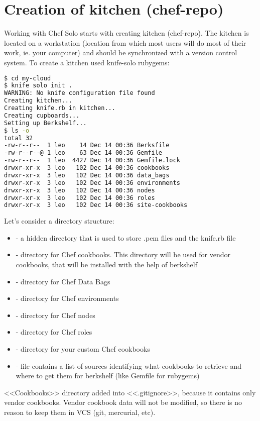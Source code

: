 \section{Creation of kitchen (chef-repo)}
\label{sec:solo-kitchen}

Working with Chef Solo starts with creating kitchen (chef-repo). The kitchen is located on a workstation (location from which most users will do most of their work, ie. your computer) and should be synchronized with a version control system. To create a kitchen used knife-solo rubygems:

\begin{lstlisting}[language=Bash,label=lst:my-cloud-kitchen1,title=my-cloud]
$ cd my-cloud
$ knife solo init .
WARNING: No knife configuration file found
Creating kitchen...
Creating knife.rb in kitchen...
Creating cupboards...
Setting up Berkshelf...
$ ls -o
total 32
-rw-r--r--  1 leo    14 Dec 14 00:36 Berksfile
-rw-r--r--@ 1 leo    63 Dec 14 00:36 Gemfile
-rw-r--r--  1 leo  4427 Dec 14 00:36 Gemfile.lock
drwxr-xr-x  3 leo   102 Dec 14 00:36 cookbooks
drwxr-xr-x  3 leo   102 Dec 14 00:36 data_bags
drwxr-xr-x  3 leo   102 Dec 14 00:36 environments
drwxr-xr-x  3 leo   102 Dec 14 00:36 nodes
drwxr-xr-x  3 leo   102 Dec 14 00:36 roles
drwxr-xr-x  3 leo   102 Dec 14 00:36 site-cookbooks
\end{lstlisting}

Let's consider a directory structure:

\begin{itemize}
  \item {} - a hidden directory that is used to store .pem files and the knife.rb file
  \item {} - directory for Chef cookbooks. This directory will be used for vendor cookbooks, that will be installed with the help of berkshelf
  \item {} - directory for Chef Data Bags
  \item {} - directory for Chef environments
  \item {} - directory for Chef nodes
  \item {} - directory for Chef roles
  \item {} - directory for your custom Chef cookbooks
  \item {} - file contains a list of sources identifying what cookbooks to retrieve and where to get them for berkshelf (like Gemfile for rubygems)
\end{itemize}

<<Cookbooks>> directory added into <<.gitignore>>, because it contains only vendor cookbooks. Vendor cookbook data will not be modified, so there is no reason to keep them in VCS (git, mercurial, etc).
